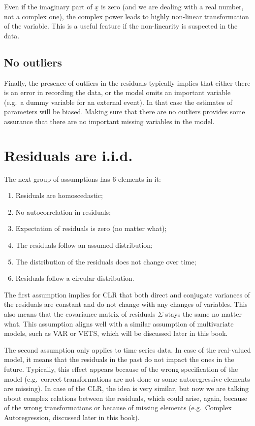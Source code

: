 \documentclass[
]{book}
\providecommand{\tightlist}{%
  \setlength{\itemsep}{0pt}\setlength{\parskip}{0pt}}
\begin{document}
Even if the imaginary part of \(\underline{x}\) is zero (and we are dealing with a real number, not a complex one), the complex power leads to highly non-linear transformation of the variable. This is a useful feature if the non-linearity is suspected in the data.

\hypertarget{no-outliers}{%
\subsection{No outliers}\label{no-outliers}}

Finally, the presence of outliers in the residuals typically implies that either there is an error in recording the data, or the model omits an important variable (e.g.~a dummy variable for an external event). In that case the estimates of parameters will be biased. Making sure that there are no outliers provides some assurance that there are no important missing variables in the model.

\hypertarget{residuals-are-i.i.d.}{%
\section{Residuals are i.i.d.}\label{residuals-are-i.i.d.}}

The next group of assumptions has 6 elements in it:

\begin{enumerate}
\def\labelenumi{\arabic{enumi}.}
\tightlist
\item
  Residuals are homoscedastic;
\item
  No autocorrelation in residuals;
\item
  Expectation of residuals is zero (no matter what);
\item
  The residuals follow an assumed distribution;
\item
  The distribution of the residuals does not change over time;
\item
  Residuals follow a circular distribution.
\end{enumerate}

The first assumption implies for CLR that both direct and conjugate variances of the residuals are constant and do not change with any changes of variables. This also means that the covariance matrix of residuals \(\Sigma\) stays the same no matter what. This assumption aligns well with a similar assumption of multivariate models, such as VAR or VETS, which will be discussed later in this book.

The second assumption only applies to time series data. In case of the real-valued model, it means that the residuals in the past do not impact the ones in the future. Typically, this effect appears because of the wrong specification of the model (e.g.~correct transformations are not done or some autoregressive elements are missing). In case of the CLR, the idea is very similar, but now we are talking about complex relations between the residuals, which could arise, again, because of the wrong transformations or because of missing elements (e.g.~Complex Autoregression, discussed later in this book).
\end{document}
